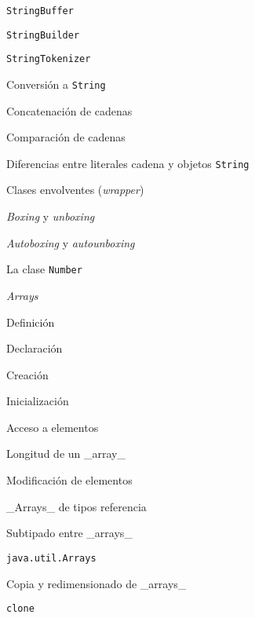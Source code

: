 \begin{longenum}
\begin{longenum}
\begin{longenum}
\begin{longenum}
                \begin{longenum}
                    \item \texttt{StringBuffer}
                    \item \texttt{StringBuilder}
                    \item \texttt{StringTokenizer}
                \end{longenum}
                \item Conversión a \texttt{String}
                \item Concatenación de cadenas
                \item Comparación de cadenas
                \item Diferencias entre literales cadena y objetos \texttt{String}
            \end{longenum}
            \item Clases envolventes (\textit{wrapper})
            \begin{longenum}
                \item \textit{Boxing} y \textit{unboxing}
                \item \textit{Autoboxing} y \textit{autounboxing}
                \item La clase \texttt{Number}
            \end{longenum}
        \end{longenum}
        \item \textit{Arrays}
        \begin{longenum}
            \item Definición
            \item Declaración
            \item Creación
            \item Inicialización
            \item Acceso a elementos
            \item Longitud de un \_array\_
            \item Modificación de elementos
            \item \_Arrays\_ de tipos referencia
            \item Subtipado entre \_arrays\_
            \item \texttt{java.util.Arrays}
            \item Copia y redimensionado de \_arrays\_
            \begin{longenum}
                \item \texttt{clone}

\end{longenum}
\end{longenum}
\end{longenum}
\end{longenum}
